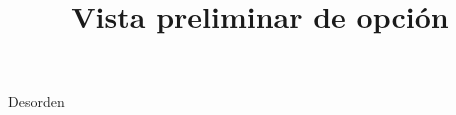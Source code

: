 \documentclass[a4paper,10pt]{article}\usepackage[utf8]{inputenc}\usepackage[spanish]{babel}\usepackage{times}
\title{Vista preliminar de opción}
\begin{document}
\twocolumn 

\maketitle

Desorden
\end{document}
